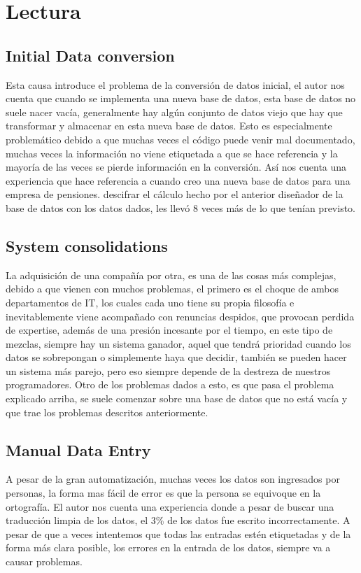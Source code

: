 \documentclass{article}
\begin{document}
\section{Lectura}
\subsection{Initial Data conversion}
Esta causa introduce el problema de la conversión de datos inicial, el autor nos cuenta que cuando se implementa una nueva base de datos, esta base de datos no suele nacer vacía, generalmente hay algún conjunto de datos viejo que hay que transformar y almacenar en esta nueva base de datos. \medbreak
Esto es especialmente problemático debido a que muchas veces el código puede venir mal documentado, muchas veces la información no viene etiquetada a que se hace referencia y la mayoría de las veces se pierde información en la conversión.\medbreak
    Así nos cuenta una experiencia que hace referencia a cuando creo una nueva base de datos para una empresa de pensiones. descifrar el cálculo hecho por el anterior diseñador de la base de datos con los datos dados, les llevó 8 veces más de lo que tenían previsto.
\subsection{System consolidations}
La adquisición de una compañía por otra, es una de las cosas más complejas, debido a que vienen con muchos problemas, el primero es el choque de ambos departamentos de IT, los cuales cada uno tiene su propia filosofía e inevitablemente viene acompañado con renuncias despidos, que provocan perdida de expertise, además de una presión incesante por el tiempo, en este tipo de mezclas, siempre hay un sistema ganador, aquel que tendrá prioridad cuando los datos se sobrepongan o simplemente haya que decidir, también se pueden hacer un sistema más parejo, pero eso siempre depende de la destreza de nuestros programadores. \medbreak
Otro de los problemas dados a esto, es que pasa el problema explicado arriba, se suele comenzar sobre una base de datos que no está vacía y que trae los problemas descritos anteriormente.
\subsection{Manual Data Entry}
A pesar de la gran automatización, muchas veces los datos son ingresados por personas, la forma mas fácil de error es que la persona se equivoque en la ortografía.\medbreak
El autor nos cuenta una experiencia donde a pesar de buscar una traducción limpia de los datos, el 3\% de los datos fue escrito incorrectamente. \medbreak
A pesar de que a veces intentemos que todas las entradas estén etiquetadas y de la forma más clara posible, los errores en la entrada de los datos, siempre va a causar problemas.
\end{document}

